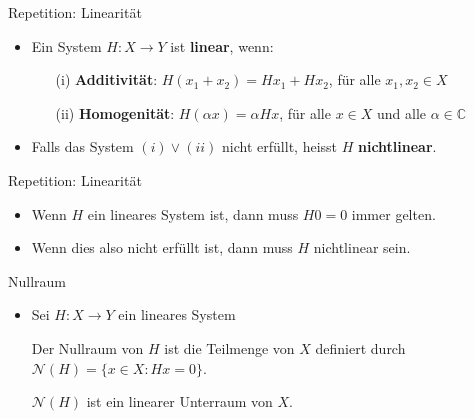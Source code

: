 \documentclass[14pt, aspectratio=169, handout]{beamer}
\begin{document}
\begin{frame}{Repetition: Linearität}
    \begin{itemize}
        \item Ein System $H:X \to Y$ ist \textbf{linear}, wenn:
        \item[] \begin{itemize}
            \item[] 
            \item[(i)] \textbf{Additivität}: $H(x_1 + x_2) = Hx_1 + Hx_2$, für alle $x_1,x_2 \in X$
            \item[] 
            \item[(ii)] \textbf{Homogenität}: $H(\alpha x) = \alpha H x$, für alle $x\in X$ und alle $\alpha \in \mathbb{C}$
        \end{itemize}
        \item[]  
        \item Falls das System $(i) \lor (ii)$ nicht erfüllt, heisst $H$ \textbf{nichtlinear}.
    \end{itemize}  
\end{frame}

\begin{frame}{Repetition: Linearität}
    \begin{itemize}
        \item Wenn $H$ ein lineares System ist, dann muss $H0 = 0$ immer gelten.
        \item[] 
        \item Wenn dies also nicht erfüllt ist, dann muss $H$ nichtlinear sein.
    \end{itemize}
\end{frame}

\begin{frame}{Nullraum}
    \begin{itemize}
        \item Sei $H:X \to Y$ ein lineares System
        \item[] 
        \item[] Der Nullraum von $H$ ist die Teilmenge von $X$ definiert durch $\mathcal{N}(H) = \{x \in X : Hx = 0\}$.
        \item[] 
        \item[] $\mathcal{N}(H)$ ist ein linearer Unterraum von $X$.
        \item[] 
        \item[] 
        \item[] 
    \end{itemize}
\end{frame}
\end{document}
